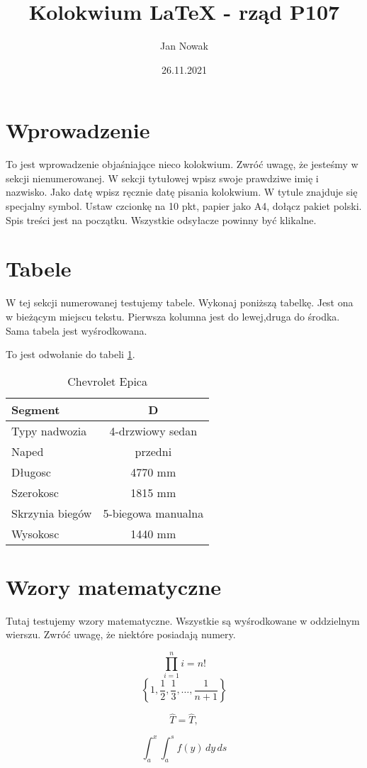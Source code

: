 \documentclass[10pt,a4paper]{article}
\title{Kolokwium \LaTeX{} - rząd P107}
\author{Jan Nowak}
\date{26.11.2021}
\begin{document}
\maketitle
\tableofcontents

\section*{Wprowadzenie}

To jest wprowadzenie objaśniające nieco kolokwium. Zwróć uwagę, że jesteśmy w sekcji nienumerowanej. W sekcji tytułowej wpisz swoje prawdziwe imię i nazwisko. Jako datę wpisz ręcznie datę pisania kolokwium. W tytule znajduje się specjalny symbol. Ustaw czcionkę na 10 pkt, papier jako A4, dołącz pakiet polski. Spis treści jest na początku. Wszystkie odsyłacze powinny być klikalne.

\section{Tabele}

W tej sekcji numerowanej testujemy tabele. Wykonaj poniższą tabelkę. Jest ona w bieżącym miejscu tekstu. Pierwsza kolumna jest do lewej,druga do  środka. Sama tabela jest wyśrodkowana.

To jest odwołanie do tabeli \ref{tab:chev}.

\begin{table}[h]
    \centering
    \begin{tabular}{|l|c|} \hline
Segment &D \\\hline
Typy nadwozia &4-drzwiowy sedan\\\hline
Naped& przedni\\\hline
Długosc &4770 mm\\\hline
Szerokosc &1815 mm\\\hline
Skrzynia biegów &5-biegowa manualna\\\hline
Wysokosc& 1440 mm\\\hline
    \end{tabular}
    \caption{Chevrolet Epica}
    \label{tab:chev}
\end{table}

\section{Wzory matematyczne}

Tutaj testujemy wzory matematyczne. Wszystkie są wyśrodkowane w oddzielnym wierszu. Zwróć uwagę, że niektóre posiadają numery.

$$\prod_{i=1}^n i =n!$$
$$\left\{
1,\frac{1}{2}, \frac{1}{3}, \ldots, 
\frac{1}{n+1}
\right\}
$$

\begin{equation}
    \hat{T} = \widehat{T}, 
\end{equation}

$$\int _a^x \int _a^s f(y) \, dy \, ds$$
\end{document}
